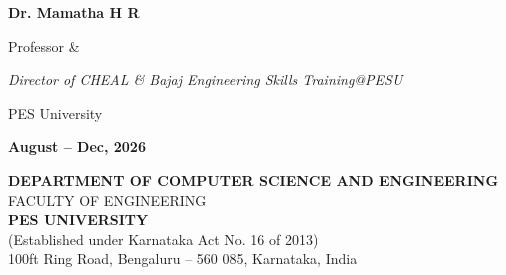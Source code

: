 \begin{titlepage}
\colorbox{guidebox}{\parbox{12.4cm}{\centering\vspace{2mm}
  {\bfseries\fontsize{14}{17}\selectfont Dr. Mamatha H R\par}
  {\fontsize{12}{15}\selectfont Professor \&\par}
  {\itshape\fontsize{11.5}{14}\selectfont Director of CHEAL \& Bajaj Engineering Skills Training@PESU\par}
  {\fontsize{12}{15}\selectfont PES University\par}\vspace{2mm}}}\par
\vspace{5mm}
{\color{p2red}\bfseries\fontsize{12.5}{15}\selectfont August -- Dec, 2026\par}
\vspace{4mm}
{\fontsize{12}{15}\selectfont
\textbf{DEPARTMENT OF COMPUTER SCIENCE AND ENGINEERING}\\
FACULTY OF ENGINEERING\\
\textbf{PES UNIVERSITY}\\
(Established under Karnataka Act No. 16 of 2013)\\
100ft Ring Road, Bengaluru -- 560 085, Karnataka, India\par}
\end{titlepage}
